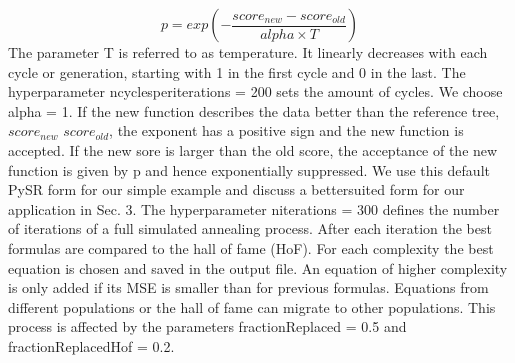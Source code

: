 \begin{equation}
	p = exp\left( - \frac{score_{new} - score_{old}}{alpha\times T} \right)
\end{equation}
The parameter T is referred to as temperature. It linearly decreases with each cycle or generation, starting with 1 in the first cycle and 0 in the last. The hyperparameter ncyclesperiterations = 200 sets the amount of cycles. We choose alpha = 1. If the new function describes the data better than the reference tree, $score_{new}$ $score_{old}$, the exponent has a positive sign and the new function is accepted. If the new sore is larger than the old score, the acceptance of the new function is given by p and hence exponentially suppressed. We use this default PySR form for our simple example and discuss a bettersuited form for our application in Sec. 3. The hyperparameter niterations = 300 defines the number of iterations of a full simulated annealing process. After each iteration the best formulas are compared to the hall of fame (HoF). For each complexity the best equation is chosen and saved in the output file. An equation of higher complexity is only added if its MSE is smaller than for previous formulas. Equations from different populations or the hall of fame can migrate to other populations. This process is affected by the parameters fractionReplaced = 0.5 and fractionReplacedHof = 0.2.